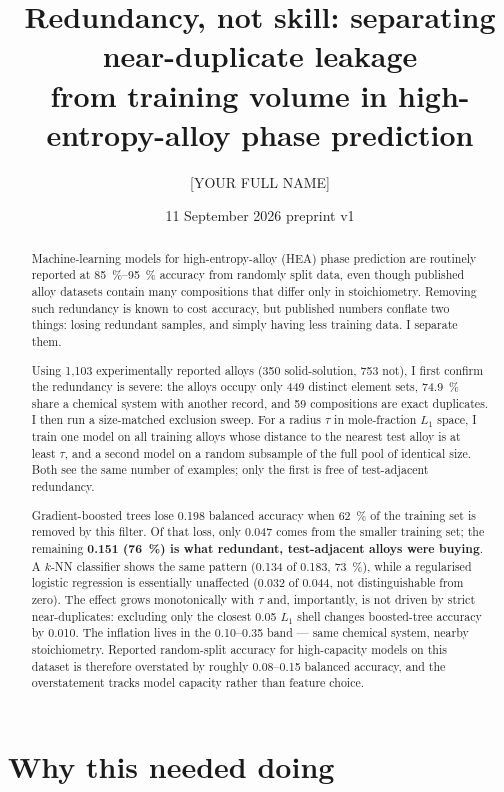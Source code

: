 \documentclass[11pt]{article}
\title{\bfseries Redundancy, not skill: separating near-duplicate leakage\\ from training volume in high-entropy-alloy phase prediction}
\author[1]{[YOUR FULL NAME]}
\affil[1]{[SCHOOL NAME], Beijing, China}
\date{11 September 2026 \quad\textbar\quad preprint v1}
\begin{document}
\maketitle

\begin{abstract}
\noindent
Machine-learning models for high-entropy-alloy (HEA) phase prediction are routinely reported at \SI{85}{\percent}--\SI{95}{\percent} accuracy from randomly split data, even though published alloy datasets contain many compositions that differ only in stoichiometry. Removing such redundancy is known to cost accuracy, but published numbers conflate two things: losing redundant samples, and simply having less training data. I separate them.

Using 1{,}103 experimentally reported alloys (350 solid-solution, 753 not), I first confirm the redundancy is severe: the alloys occupy only 449 distinct element sets, \SI{74.9}{\percent} share a chemical system with another record, and 59 compositions are exact duplicates. I then run a size-matched exclusion sweep. For a radius $\tau$ in mole-fraction $L_1$ space, I train one model on all training alloys whose distance to the nearest test alloy is at least $\tau$, and a second model on a random subsample of the full pool of identical size. Both see the same number of examples; only the first is free of test-adjacent redundancy.

Gradient-boosted trees lose 0.198 balanced accuracy when \SI{62}{\percent} of the training set is removed by this filter. Of that loss, only 0.047 comes from the smaller training set; the remaining \textbf{0.151 (\SI{76}{\percent}) is what redundant, test-adjacent alloys were buying}. A $k$-NN classifier shows the same pattern (0.134 of 0.183, \SI{73}{\percent}), while a regularised logistic regression is essentially unaffected (0.032 of 0.044, not distinguishable from zero). The effect grows monotonically with $\tau$ and, importantly, is not driven by strict near-duplicates: excluding only the closest 0.05 $L_1$ shell changes boosted-tree accuracy by 0.010. The inflation lives in the 0.10--0.35 band --- same chemical system, nearby stoichiometry. Reported random-split accuracy for high-capacity models on this dataset is therefore overstated by roughly 0.08--0.15 balanced accuracy, and the overstatement tracks model capacity rather than feature choice.
\end{abstract}

\section{Why this needed doing}
\end{document}
